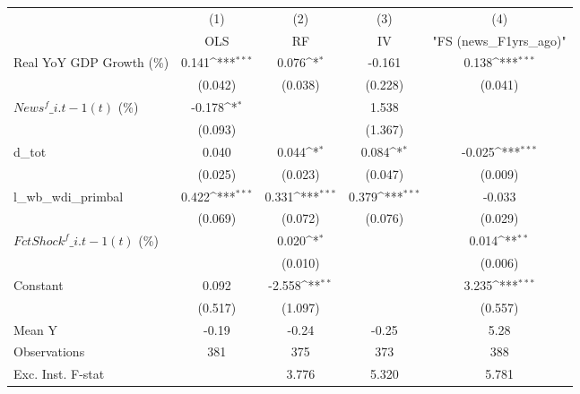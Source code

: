 {
\def\sym#1{\ifmmode^{#1}\else\(^{#1}\)\fi}
\begin{tabular}{l*{4}{c}}
\toprule
                    &\multicolumn{1}{c}{(1)}&\multicolumn{1}{c}{(2)}&\multicolumn{1}{c}{(3)}&\multicolumn{1}{c}{(4)}\\
                    &\multicolumn{1}{c}{OLS}&\multicolumn{1}{c}{RF}&\multicolumn{1}{c}{IV}&\multicolumn{1}{c}{ "FS (news\_F1yrs\_ago)" }\\
\midrule
Real YoY GDP Growth (\%)&       0.141\sym{***}&       0.076\sym{*}  &      -0.161         &       0.138\sym{***}\\
                    &     (0.042)         &     (0.038)         &     (0.228)         &     (0.041)         \\
\addlinespace
$ News^f\_{i.t-1}(t)$ (\%)&      -0.178\sym{*}  &                     &       1.538         &                     \\
                    &     (0.093)         &                     &     (1.367)         &                     \\
\addlinespace
d\_tot               &       0.040         &       0.044\sym{*}  &       0.084\sym{*}  &      -0.025\sym{***}\\
                    &     (0.025)         &     (0.023)         &     (0.047)         &     (0.009)         \\
\addlinespace
l\_wb\_wdi\_primbal    &       0.422\sym{***}&       0.331\sym{***}&       0.379\sym{***}&      -0.033         \\
                    &     (0.069)         &     (0.072)         &     (0.076)         &     (0.029)         \\
\addlinespace
$ FctShock^f\_{i.t-1}(t)$ (\%)&                     &       0.020\sym{*}  &                     &       0.014\sym{**} \\
                    &                     &     (0.010)         &                     &     (0.006)         \\
\addlinespace
Constant            &       0.092         &      -2.558\sym{**} &                     &       3.235\sym{***}\\
                    &     (0.517)         &     (1.097)         &                     &     (0.557)         \\
\midrule
Mean Y              &       -0.19         &       -0.24         &       -0.25         &        5.28         \\
Observations        &         381         &         375         &         373         &         388         \\
Exc. Inst. F-stat   &                     &       3.776         &       5.320         &       5.781         \\
\bottomrule
\end{tabular}
}

